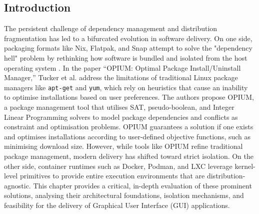 \documentclass[journal,onecolumn]{IEEEtran}
\begin{document}
\subsection{Introduction}
The persistent challenge of dependency management and distribution fragmentation has led to a bifurcated evolution in software delivery. On one side, packaging formats like Nix, Flatpak, and Snap attempt to solve the "dependency hell" problem by rethinking how software is bundled and isolated from the host operating system \cite{Varun2019}. In the paper ``OPIUM: Optimal Package Install/Uninstall Manager,'' Tucker et al. \cite{10.1109/ICSE.2007.59} address the limitations of traditional Linux package managers like \texttt{apt-get} and \texttt{yum}, which rely on heuristics that cause an inability to optimise installations based on user preferences. The authors propose OPIUM, a package management tool that utilises SAT, pseudo-boolean, and Integer Linear Programming solvers to model package dependencies and conflicts as constraint and optimisation problems. OPIUM guarantees a solution if one exists and optimises installations according to user-defined objective functions, such as minimising download size. However, while tools like OPIUM refine traditional package management, modern delivery has shifted toward strict isolation. On the other side, container runtimes such as Docker, Podman, and LXC leverage kernel-level primitives to provide entire execution environments that are distribution-agnostic. This chapter provides a critical, in-depth evaluation of these prominent solutions, analysing their architectural foundations, isolation mechanisms, and feasibility for the delivery of Graphical User Interface (GUI) applications.
\end{document}
